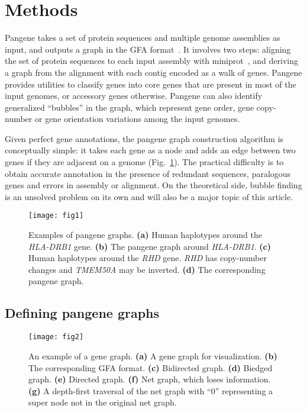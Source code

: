 \documentclass[webpdf,contemporary,large,namedate]{oup-authoring-template}%
\begin{document}
\section{Methods}

Pangene takes a set of protein sequences and multiple genome assemblies as input,
and outputs a graph in the GFA format~\citep{Li:2020aa}.
It involves two steps: aligning the set of protein sequences to each input assembly with miniprot~\citep{Li:2023ac},
and deriving a graph from the alignment with each contig encoded as a walk of genes.
Pangene provides utilities to classify genes into core genes that are present in most of the input genomes, or accessory genes otherwise.
Pangene can also identify generalized ``bubbles'' in the graph, which represent gene order,
gene copy-number or gene orientation variations among the input genomes.

Given perfect gene annotations, the pangene graph construction algorithm is conceptually simple:
it takes each gene as a node and adds an edge between two genes if they are adjacent on a genome (Fig.~\ref{fig:ex1}).
The practical difficulty is to obtain accurate annotation in the presence of redundant sequences, paralogous genes and errors in assembly or alignment.
On the theoretical side, bubble finding is an unsolved problem on its own
and will also be a major topic of this article.

\begin{figure}[b!]
\centering
\texttt{[image: fig1]}
\caption{Examples of pangene graphs. {\bf (a)} Human haplotypes around the
\emph{HLA-DRB1} gene. {\bf (b)} The pangene graph around \emph{HLA-DRB1}. {\bf
(c)} Human haplotypes around the \emph{RHD} gene. \emph{RHD} has copy-number
changes and \emph{TMEM50A} may be inverted. {\bf (d)} The corresponding pangene
graph.}\label{fig:ex1}
\end{figure}

\subsection{Defining pangene graphs}

\begin{figure}[t!]
\centering
\texttt{[image: fig2]}
\caption{An example of a gene graph. {\bf (a)} A gene graph for visualization.
{\bf (b)} The corresponding GFA format.
{\bf (c)} Bidirected graph.
{\bf (d)} Biedged graph.
{\bf (e)} Directed graph.
{\bf (f)} Net graph, which loses information.
{\bf (g)} A depth-first traversal of the net graph with ``0'' representing a super node
not in the original net graph.}\label{fig:exa1}
\end{figure}
\end{document}
